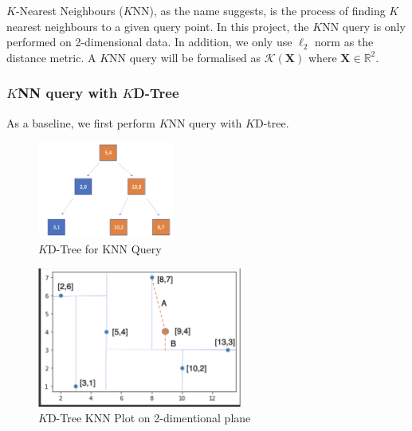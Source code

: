 $K$-Nearest Neighbours ($K$NN), as the name suggests, is the process of finding $K$ nearest neighbours to a given query point. In this project, the $K$NN query is only performed on 2-dimensional data. In addition, we only use $\ell_2$ norm as the distance metric. A $K$NN query will be formalised as $\mathcal{K}(\boldsymbol{X})$ where $\boldsymbol{X}\in\mathbb{R}^2$.

\subsubsection{$K$NN query with $K$D-Tree}

As a baseline, we first perform $K$NN query with $K$D-tree.

\begin{figure}[htp]
    \centering
    \includegraphics[width=0.4\textwidth]{graphs/KD-Tree_KNN_Tree.png}
    \caption{$K$D-Tree for KNN Query}
    \label{fig:$K$D-Tree_for_KNN Query}
\end{figure}

\begin{figure}[htp]
    \centering
    \includegraphics[width=0.6\textwidth]{graphs/KD-Tree_KNN_plot.png}
    \caption{$K$D-Tree KNN Plot on 2-dimentional plane}
    \label{fig:KD_Tree_KNN_Plot}
\end{figure}



